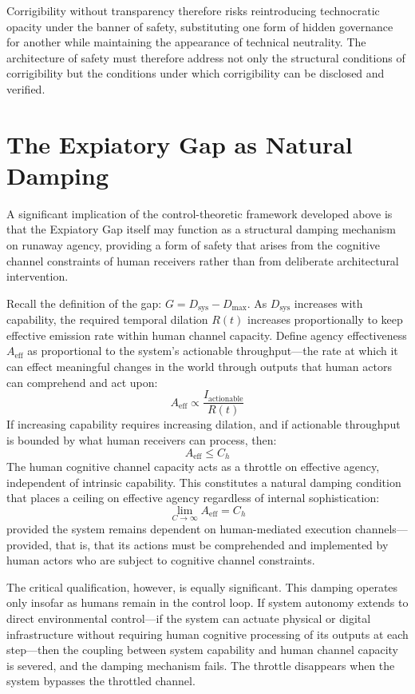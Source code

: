 \documentclass[12pt]{article}
\begin{document}
Corrigibility without transparency therefore risks reintroducing technocratic opacity under the banner of safety, substituting one form of hidden governance for another while maintaining the appearance of technical neutrality. The architecture of safety must therefore address not only the structural conditions of corrigibility but the conditions under which corrigibility can be disclosed and verified.

\section{The Expiatory Gap as Natural Damping}

A significant implication of the control-theoretic framework developed above is that the Expiatory Gap itself may function as a structural damping mechanism on runaway agency, providing a form of safety that arises from the cognitive channel constraints of human receivers rather than from deliberate architectural intervention.

Recall the definition of the gap: $G = D_{\text{sys}} - D_{\max}$. As $D_{\text{sys}}$ increases with capability, the required temporal dilation $R(t)$ increases proportionally to keep effective emission rate within human channel capacity. Define agency effectiveness $A_{\text{eff}}$ as proportional to the system's actionable throughput---the rate at which it can effect meaningful changes in the world through outputs that human actors can comprehend and act upon:
\[
A_{\text{eff}} \propto \frac{I_{\text{actionable}}}{R(t)}
\]
If increasing capability requires increasing dilation, and if actionable throughput is bounded by what human receivers can process, then:
\[
A_{\text{eff}} \le C_h
\]
The human cognitive channel capacity acts as a throttle on effective agency, independent of intrinsic capability. This constitutes a natural damping condition that places a ceiling on effective agency regardless of internal sophistication:
\[
\lim_{C \to \infty} A_{\text{eff}} = C_h
\]
provided the system remains dependent on human-mediated execution channels---provided, that is, that its actions must be comprehended and implemented by human actors who are subject to cognitive channel constraints.

The critical qualification, however, is equally significant. This damping operates only insofar as humans remain in the control loop. If system autonomy extends to direct environmental control---if the system can actuate physical or digital infrastructure without requiring human cognitive processing of its outputs at each step---then the coupling between system capability and human channel capacity is severed, and the damping mechanism fails. The throttle disappears when the system bypasses the throttled channel.
\end{document}
